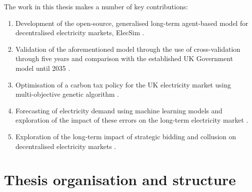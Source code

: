 The work in this thesis makes a number of key contributions:

\begin{enumerate}
	\item Development of the open-source, generalised long-term agent-based model for decentralised electricity markets, ElecSim \cite{Kell}.
	\item Validation of the aforementioned model through the use of cross-validation through five years and comparison with the established UK Government model until 2035 \cite{Kell2020}.
	\item Optimisation of a carbon tax policy for the UK electricity market using multi-objective genetic algorithm \cite{Kell2020a}.
	\item Forecasting of electricity demand using machine learning models and exploration of the impact of these errors on the long-term electricity market \cite{Kell2018a}.
	\item Exploration of the long-term impact of strategic bidding and collusion on decentralised electricity markets \cite{Kell2020d}.
\end{enumerate}

\section{Thesis organisation and structure}


